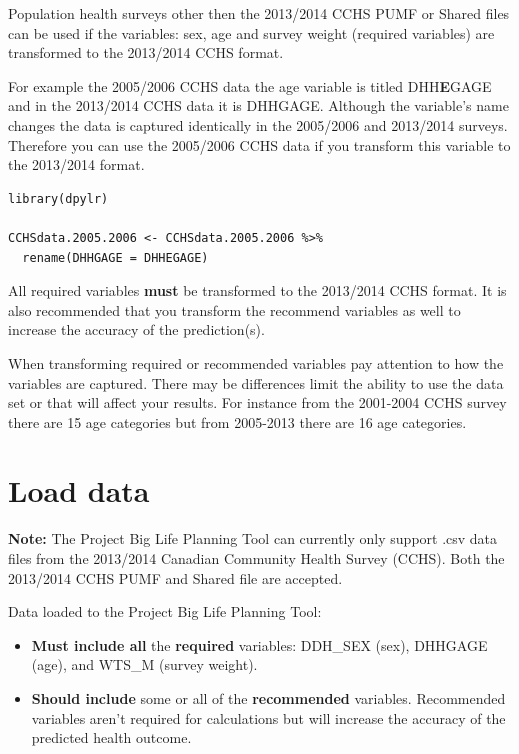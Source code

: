 \documentclass[]{book}
\begin{document}
Population health surveys other then the 2013/2014 CCHS PUMF or Shared files can be used if the variables: sex, age and survey weight (required variables) are transformed to the 2013/2014 CCHS format.

For example the 2005/2006 CCHS data the age variable is titled DHH\textbf{E}GAGE and in the 2013/2014 CCHS data it is DHHGAGE. Although the variable's name changes the data is captured identically in the 2005/2006 and 2013/2014 surveys. Therefore you can use the 2005/2006 CCHS data if you transform this variable to the 2013/2014 format.

\begin{verbatim}
library(dpylr)

CCHSdata.2005.2006 <- CCHSdata.2005.2006 %>% 
  rename(DHHGAGE = DHHEGAGE)
\end{verbatim}

All required variables \textbf{must} be transformed to the 2013/2014 CCHS format. It is also recommended that you transform the recommend variables as well to increase the accuracy of the prediction(s).

When transforming required or recommended variables pay attention to how the variables are captured. There may be differences limit the ability to use the data set or that will affect your results. For instance from the 2001-2004 CCHS survey there are 15 age categories but from 2005-2013 there are 16 age categories.

\hypertarget{load-data}{%
\section{Load data}\label{load-data}}

\textbf{Note:} The Project Big Life Planning Tool can currently only support .csv data files from the 2013/2014 Canadian Community Health Survey (CCHS). Both the 2013/2014 CCHS PUMF and Shared file are accepted.

Data loaded to the Project Big Life Planning Tool:

\begin{itemize}
\item
  \textbf{Must include all} the \textbf{required} variables: DDH\_SEX (sex), DHHGAGE (age), and WTS\_M (survey weight).
\item
  \textbf{Should include} some or all of the \textbf{recommended} variables. Recommended variables aren't required for calculations but will increase the accuracy of the predicted health outcome.
\end{itemize}
\end{document}
